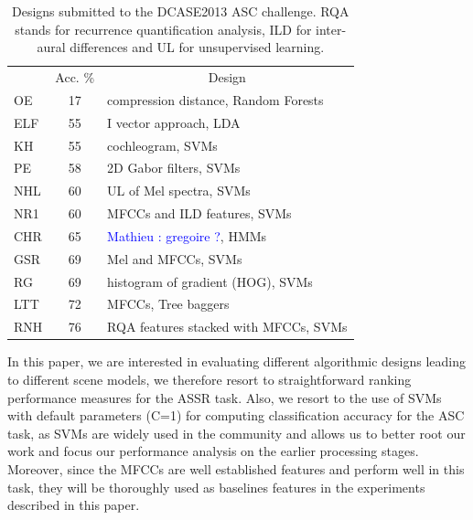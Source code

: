 \documentclass[journal]{IEEEtran}
\newcommand{\gl}[1]{\textcolor{red}{Gr\'egoire : #1}}
\newcommand{\ml}[1]{\textcolor{blue}{ Mathieu : #1}}
\begin{document}
\begin{table}
\begin{center}
\caption{Designs submitted to the DCASE2013 ASC challenge. RQA stands for recurrence quantification analysis, ILD for inter-aural differences and UL for unsupervised learning.  \label{tab:dcase}}
\begin{tabular}{lcl}
& Acc. \%  &  \multicolumn{1}{c}{Design}  \\
\cite{olivetti2013wonder} OE & 17 & compression distance, Random Forests \\
\cite{elizalde2013vector} ELF & 55 & I vector approach, LDA \\
\cite{krijnders2013tone} KH & 55 & cochleogram, SVMs \\
\cite{patil2013multiresolution} PE & 58 & 2D Gabor filters, SVMs \\
\cite{lee2013acoustic} NHL & 60 & UL of Mel spectra, SVMs \\
\cite{nogueira2013sound} NR1 & 60 & MFCCs and ILD features, SVMs \\
\cite{chum2013ieee} CHR & 65 & \ml{gregoire ?}, HMMs  \\
\cite{geiger2013large} GSR & 69 & Mel and MFCCs, SVMs \\
\cite{rakotomamonjy2015histogram} RG & 69  & histogram of gradient (HOG), SVMs \\
\cite{li2013auditory} LTT & 72 & MFCCs, Tree baggers \\
\cite{roma2013recurrence} RNH & 76 & RQA features stacked with MFCCs, SVMs \\
\end{tabular}
\end{center}
\end{table}



In this paper, we are interested in evaluating different algorithmic designs leading to different scene models, we therefore resort to straightforward ranking performance measures for the ASSR task. Also, we resort to the use of SVMs with default parameters (C=1) for computing classification accuracy for the ASC task, as SVMs are widely used in the community and allows us to better root our work and focus our performance analysis on the earlier processing stages. Moreover, since the MFCCs are well established features and perform well in this task, they will be thoroughly used as baselines features in the experiments described in this paper.

 
\end{document}
